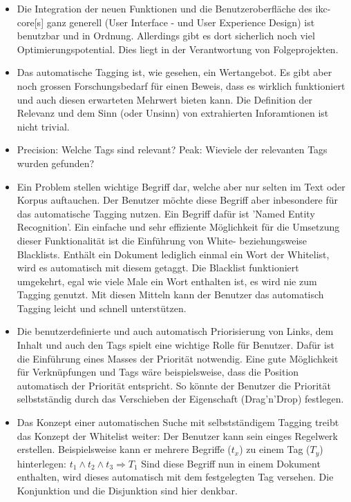 \begin{itemize}
    \item Die Integration der neuen Funktionen und die Benutzeroberfläche des \gls{ikc-core}[s] ganz generell (User Interface - und User Experience Design) ist benutzbar und in Ordnung. Allerdings gibt es dort sicherlich noch viel Optimierungspotential. Dies liegt in der Verantwortung von Folgeprojekten.
    \item Das automatische Tagging ist, wie gesehen, ein Wertangebot. Es gibt aber noch grossen Forschungsbedarf für einen Beweis, dass es wirklich funktioniert und auch diesen erwarteten Mehrwert bieten kann. Die Definition der Relevanz und dem Sinn (oder Unsinn) von extrahierten Inforamtionen ist nicht trivial.
    \item Precision: Welche Tags sind relevant? Peak: Wieviele der relevanten Tags wurden gefunden?
    \item Ein Problem stellen wichtige Begriff dar, welche aber nur selten im Text oder Korpus auftauchen. Der Benutzer möchte diese Begriff aber inbesondere für das automatische Tagging nutzen. Ein Begriff dafür ist 'Named Entity Recognition'. Ein einfache und sehr effiziente Möglichkeit für die Umsetzung dieser Funktionalität ist die Einführung von White- beziehungsweise Blacklists. Enthält ein Dokument lediglich einmal ein Wort der Whitelist, wird es automatisch mit diesem getaggt. Die Blacklist funktioniert umgekehrt, egal wie viele Male ein Wort enthalten ist, es wird nie zum Tagging genutzt. Mit diesen Mitteln kann der Benutzer das automatisch Tagging leicht und schnell unterstützen.
    \item Die benutzerdefinierte und auch automatisch Priorisierung von Links, dem Inhalt und auch den Tags spielt eine wichtige Rolle für Benutzer. Dafür ist die Einführung eines Masses der Priorität notwendig. Eine gute Möglichkeit für Verknüpfungen und Tags wäre beispielsweise, dass die Position automatisch der Priorität entspricht. So könnte der Benutzer die Priorität selbstständig durch das Verschieben der Eigenschaft (Drag'n'Drop) festlegen.
    \item Das Konzept einer automatischen Suche mit selbstständigem Tagging treibt das Konzept der Whitelist weiter: Der Benutzer kann sein einges Regelwerk erstellen. Beispielsweise kann er mehrere Begriffe ($t_x$) zu einem Tag ($T_y$) hinterlegen: $t_1\wedge t_2 \wedge t_3 \Rightarrow T_1$ Sind diese Begriff nun in einem Dokument enthalten, wird dieses automatisch mit dem festgelegten Tag versehen. Die Konjunktion und die Disjunktion sind hier denkbar.

\end{itemize}

